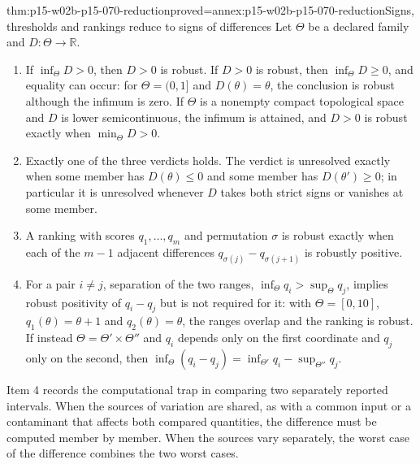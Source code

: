 \begin{hbtheorem}{thm:p15-w02b-p15-070-reduction}{proved=annex:p15-w02b-p15-070-reduction}{Signs, thresholds and rankings reduce to signs of differences}
Let \(\Theta\) be a declared family and \(D:\Theta\to\mathbb R\).
\begin{enumerate}
\item If \(\inf_\Theta D>0\), then \(D>0\) is robust. If \(D>0\) is
      robust, then \(\inf_\Theta D\geq0\), and equality can occur:
      for \(\Theta=(0,1]\) and \(D(\theta)=\theta\), the conclusion is
      robust although the infimum is zero. If \(\Theta\) is a nonempty
      compact topological space and \(D\) is lower semicontinuous, the
      infimum is attained, and \(D>0\) is robust exactly when
      \(\min_\Theta D>0\).
\item Exactly one of the three verdicts holds. The verdict is
      unresolved exactly when some member has \(D(\theta)\leq0\) and
      some member has \(D(\theta')\geq0\); in particular it is
      unresolved whenever \(D\) takes both strict signs or vanishes at
      some member.
\item A ranking with scores \(q_1,\ldots,q_m\) and permutation
      \(\sigma\) is robust exactly when each of the \(m-1\) adjacent
      differences \(q_{\sigma(j)}-q_{\sigma(j+1)}\) is robustly positive.
\item For a pair \(i\ne j\), separation of the two ranges,
      \(\inf_\Theta q_i>\sup_\Theta q_j\), implies robust positivity of
      \(q_i-q_j\) but is not required for it: with
      \(\Theta=[0,10]\), \(q_1(\theta)=\theta+1\) and
      \(q_2(\theta)=\theta\), the ranges overlap and the ranking is
      robust. If instead \(\Theta=\Theta'\times\Theta''\) and
      \(q_i\) depends only on the first coordinate and \(q_j\) only on
      the second, then
      \(\inf_\Theta(q_i-q_j)=\inf_{\Theta'}q_i-\sup_{\Theta''}q_j\).
\end{enumerate}
\end{hbtheorem}

Item 4 records the computational trap in comparing two separately reported
intervals. When the sources of variation are shared, as with a common input
or a contaminant that affects both compared quantities, the difference must
be computed member by member. When the sources vary separately, the worst
case of the difference combines the two worst cases.

